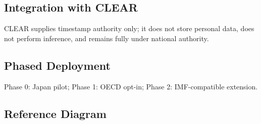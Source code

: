 \subsection{Integration with CLEAR}
CLEAR supplies timestamp authority only; it does not store personal data, does not perform inference, and remains fully under national authority.

\subsection{Phased Deployment}
Phase 0: Japan pilot; Phase 1: OECD opt-in; Phase 2: IMF-compatible extension.

\subsection{Reference Diagram}
